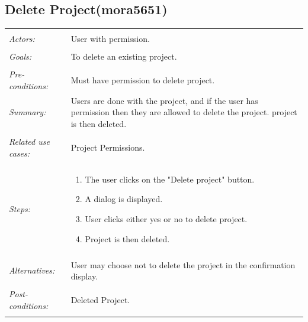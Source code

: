 \documentclass[11pt]{report}
\begin{document}
\subsection{Delete Project(mora5651)}
\begin{tabular}{ p{2cm} p{12cm} }
\hline
\\
\textit{Actors:} & User with permission.\\
\\
\textit{Goals:} & To delete an existing project. \\
\\
\textit{Pre-conditions:} & Must have permission to delete project. 
\\
\textit{Summary:} & Users are done with the project, and if the user has permission then they are allowed to delete the project. project is then deleted. \\
\\
\textit{Related use cases:} & Project Permissions. \\
\\
\textit{Steps:} & \begin{enumerate}
 \item The user clicks on the "Delete project" button. 
 \item A dialog is displayed. 
 \item User clicks either yes or no to delete project. 
 \item Project is then deleted. 
 \end{enumerate}\\
 \\
 \textit{Alternatives:} & User may choose not to delete the project in the confirmation display.\\
 \\
 \textit{Post-conditions:} & Deleted Project. \\
 \\
\hline
\end{tabular}
\end{document}
